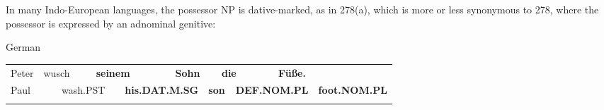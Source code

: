 \begin{styleBodytextC}
In many Indo-European languages, the possessor NP is dative-marked, as in 278(a), which is more or less synonymous to 278, where the possessor is expressed by an adnominal genitive:

\end{styleBodytextC}

\begin{listWWNumileveli}
\item 

\begin{styleExample}
\label{bkm:Ref95294441}German

\end{styleExample}

\end{listWWNumileveli}

\begin{listWWNumlxxivleveli}
\item 

\end{listWWNumlxxivleveli}

\begin{tabular}{llllllllllll}
\lsptoprule
Peter & \multicolumn{2}{l}{wusch

} & \multicolumn{2}{l}{{\bfseries seinem}

} & \multicolumn{2}{l}{{\bfseries Sohn}

} & \multicolumn{2}{l}{{\bfseries die}

} & \multicolumn{2}{l}{{\bfseries Füße.}

} & \\
\multicolumn{2}{l}{Paul

} & \multicolumn{2}{l}{wash.PST

} & \multicolumn{2}{l}{{\bfseries his.DAT.M.SG}

} & \multicolumn{2}{l}{{\bfseries son}

} & \multicolumn{2}{l}{{\bfseries DEF.NOM.PL}

} & \multicolumn{2}{l}{{\bfseries foot.NOM.PL}

}\\
\lspbottomrule
\end{tabular}

